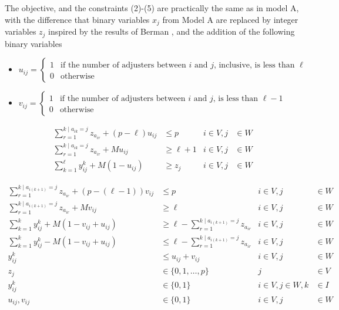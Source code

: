 \begin{frame}[allowframebreaks]
  The objective, and the constraints (2)-(5) 
  are practically the same as in model A,
  with the difference that binary variables $x_j$ from Model A
  are replaced by integer variables $z_j$ inspired by the results of Berman \cite{berman1987stochastic},
  and the addition of the following binary variables
  {\scriptsize
    \begin{itemize}
    \item $u_{ij} = \begin{cases} 1 & \mbox{if the number of adjusters between } i \mbox{ and } j \mbox{, inclusive, is less than } \ell \\
      0 & \mbox{otherwise}
    \end{cases}$
    \item $v_{ij} = \begin{cases} 1 & \mbox{if the number of adjusters between } i \mbox{ and } j \mbox{, is less than } \ell - 1 \\
      0 & \mbox{otherwise}
    \end{cases}$
    \end{itemize}
  }

{\footnotesize
  \begin{align}
    \sum_{r = 1}^{k \mid a_{ik}=j}{z_{a_{ir}}} + (p-\ell) u_{ij} & \leq p &  i \in V, j &\in W \\
    \sum_{r = 1}^{k \mid a_{ik}=j}{z_{a_{ir}}} + M u_{ij} & \geq \ell+1   &  i \in V, j &\in W \\
    \sum_{k = 1}^{\ell}{y_{ij}^{k}} + M (1 - u_{ij}) & \geq z_j           &  i \in V, j &\in W
  \end{align}
  
  \begin{align}
    \sum_{r = 1}^{k \mid a_{i(k+1)}=j}{z_{a_{ir}}} + (p-(\ell-1)) v_{ij} & \leq p                                     &  i \in V, j &\in W\\
    \sum_{r = 1}^{k \mid a_{i(k+1)}=j}{z_{a_{ir}}} + M v_{ij}         & \geq \ell                                     &  i \in V, j &\in W\\
    \sum_{k=1}^{k}{y_{ij}^{k}} + M (1 - v_{ij} + u_{ij}) & \geq \ell - \sum_{r = 1}^{k \mid a_{i(k+1)}=j}{z_{a_{ir}}} &  i \in V, j &\in W\\
    \sum_{k=1}^{k}{y_{ij}^{k}} - M (1 - v_{ij} + u_{ij}) & \leq \ell - \sum_{r = 1}^{k \mid a_{i(k+1)}=j}{z_{a_{ir}}} &  i \in V, j &\in W\\
    y_{ij}^{k} & \leq u_{ij} + v_{ij}  &        i \in V,j &\in W \\
    z_j & \in \{0,1,\ldots,p\}         &                j &\in V \nonumber\\
    y_{ij}^{k} & \in \{0,1\}           &  i\in V,j\in W,k &\in I \nonumber\\
    u_{ij},v_{ij} & \in \{0,1\}        &        i \in V,j &\in W \nonumber
  \end{align}
}
\end{frame}
